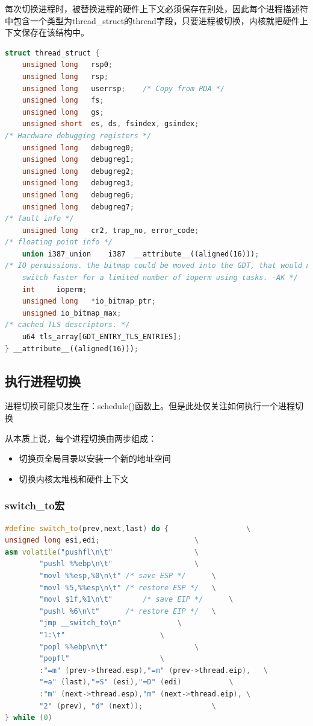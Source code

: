     每次切换进程时，被替换进程的硬件上下文必须保存在别处，因此每个进程描述符中包含一个类型为thread\_struct的thread字段，只要进程被切换，内核就把硬件上下文保存在该结构中。

\begin{lstlisting}[language=C++]
struct thread_struct {
    unsigned long	rsp0;
    unsigned long	rsp;
    unsigned long 	userrsp;	/* Copy from PDA */ 
    unsigned long	fs;
    unsigned long	gs;
    unsigned short	es, ds, fsindex, gsindex;	
/* Hardware debugging registers */
    unsigned long	debugreg0;  
    unsigned long	debugreg1;  
    unsigned long	debugreg2;  
    unsigned long	debugreg3;  
    unsigned long	debugreg6;  
    unsigned long	debugreg7;  
/* fault info */
    unsigned long	cr2, trap_no, error_code;
/* floating point info */
    union i387_union	i387  __attribute__((aligned(16)));
/* IO permissions. the bitmap could be moved into the GDT, that would make
    switch faster for a limited number of ioperm using tasks. -AK */
    int		ioperm;
    unsigned long	*io_bitmap_ptr;
    unsigned io_bitmap_max;
/* cached TLS descriptors. */
    u64 tls_array[GDT_ENTRY_TLS_ENTRIES];
} __attribute__((aligned(16)));
\end{lstlisting}

\subsection{执行进程切换}

    进程切换可能只发生在：schedule()函数上。但是此处仅关注如何执行一个进程切换

    从本质上说，每个进程切换由两步组成：

\begin{itemize}
    \item 切换页全局目录以安装一个新的地址空间
    \item 切换内核太堆栈和硬件上下文
\end{itemize}

\subsubsection{switch\_to宏}

\begin{lstlisting}[language=C++]
#define switch_to(prev,next,last) do {					\
unsigned long esi,edi;						\
asm volatile("pushfl\n\t"					\
        "pushl %%ebp\n\t"					\
        "movl %%esp,%0\n\t"	/* save ESP */		\
        "movl %5,%%esp\n\t"	/* restore ESP */	\
        "movl $1f,%1\n\t"		/* save EIP */		\
        "pushl %6\n\t"		/* restore EIP */	\
        "jmp __switch_to\n"				\
        "1:\t"						\
        "popl %%ebp\n\t"					\
        "popfl"						\
        :"=m" (prev->thread.esp),"=m" (prev->thread.eip),	\
        "=a" (last),"=S" (esi),"=D" (edi)			\
        :"m" (next->thread.esp),"m" (next->thread.eip),	\
        "2" (prev), "d" (next));				\
} while (0)
\end{lstlisting}

